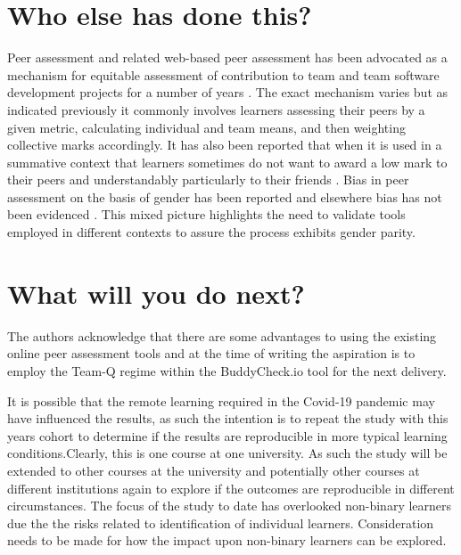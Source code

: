 \documentclass[sigconf, anonymous=true]{acmart}
\begin{document}
\section{Who else has done this?}
Peer assessment and related web-based peer assessment has been advocated as a mechanism for equitable assessment of contribution to team and team software development projects for a number of years \cite{Clark2005,Raban_Litchfield_2007, Gordon2010,Fagerholm, Britton2017,Philips21}. The exact mechanism varies but as indicated previously it commonly involves learners assessing their peers by a given metric, calculating individual and team means, and then weighting collective marks accordingly. It has also been reported that when it is used in a summative context that learners sometimes do not want to award a low mark to their peers and understandably particularly to their friends \cite{Sridharam2003}.  Bias in peer assessment on the basis of gender has been reported \cite{Heels2019,Stonewall2018} and elsewhere bias has not been evidenced \cite{Tucker2014,Falchikov1997}. This mixed picture highlights the need to validate tools employed in different contexts to assure the process exhibits gender parity.

\section{What will you do next?}
The authors acknowledge that there are some advantages to using the existing online peer assessment tools and at the time of writing the aspiration is to employ the Team-Q regime within the BuddyCheck.io tool for the next delivery.

It is possible that the remote learning required in the Covid-19 pandemic may have influenced the results, as such the intention is to repeat the study with this years cohort to determine if the results are reproducible in more typical learning conditions.Clearly, this is one course at one university. As such the study will be extended to other courses at the university and potentially other courses at different institutions again to explore if the outcomes are reproducible in different circumstances. The focus of the study to date has overlooked non-binary learners due the the risks related to identification of individual learners. Consideration needs to be made for how the impact upon non-binary learners can be explored.
\end{document}
